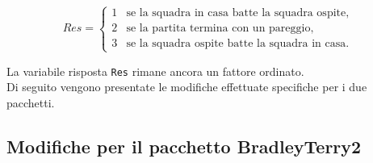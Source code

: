 \begin{equation}
	Res =
	\begin{cases}
		1 & \text{se la squadra in casa batte la squadra ospite,}\\
		2 & \text{se la partita termina con un pareggio,}\\
		3 & \text{se la squadra ospite batte la squadra in casa. }
	\end{cases}       
\end{equation}

La variabile risposta \texttt{Res} rimane ancora un fattore ordinato.\\
Di seguito vengono presentate le modifiche effettuate specifiche per i due pacchetti.
\subsection{Modifiche per il pacchetto BradleyTerry2}

